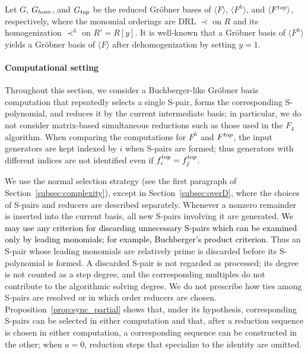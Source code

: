 \documentclass{article}
\theoremstyle{definition}
\theoremstyle{plain}
\theoremstyle{plain}
\theoremstyle{plain}
\theoremstyle{plain}
\numberwithin{equation}{subsection}
\begin{document}
Let $G$, $G_{\rm hom}$, and $G_{\rm top}$ be the reduced Gr\"obner bases of $\langle F\rangle$, $\langle F^h\rangle$, and $\langle F^{\rm top}\rangle$, respectively, where the monomial orderings are DRL $\prec$ on $R$ and its homogenization $\prec^h$ on $R'=R[y]$.
It is well-known that a Gr\"obner basis of $\langle F^h\rangle$ yields a Gr\"obner basis of $\langle F\rangle$ after dehomogenization by setting $y=1$.

\paragraph{Computational setting}
Throughout this section, we consider a Buchberger-like Gr\"obner basis computation that repeatedly selects a single S-pair, forms the corresponding S-polynomial, and reduces it by the current intermediate basis;
in particular, we do not consider matrix-based simultaneous reductions such as those used in the $F_4$ algorithm.
When comparing the computations for $F^h$ and $F^{\rm top}$, the input generators are kept indexed by $i$ when S-pairs are formed;
thus generators with different indices are not identified even if $f_i^{\rm top}=f_j^{\rm top}$.

We use the normal selection strategy (see the first paragraph of Section~\ref{subsec:complexity}), except in Section~\ref{subsec:overD}, where the choices of S-pairs and reducers are described separately.
Whenever a nonzero remainder is inserted into the current basis, all new S-pairs involving it are generated.
\textcolor{black}{We may use any criterion for discarding unnecessary S-pairs which can be examined only by leading monomials; for example, Buchberger's product criterion.}
Thus an S-pair whose leading monomials are relatively prime is discarded before its S-polynomial is formed.
A discarded S-pair is not regarded as processed; its degree is not counted as a step degree, and the corresponding multiples do not contribute to the algorithmic solving degree.
We do not prescribe how ties among S-pairs are resolved or in which order reducers are chosen.
Proposition~\ref{prop:sync_partial} shows that, under its hypothesis, corresponding S-pairs can be selected in either computation and that, after a reduction sequence is chosen in either computation, a corresponding sequence can be constructed in the other; when $a=0$, reduction steps that specialize to the identity are omitted.
\end{document}

